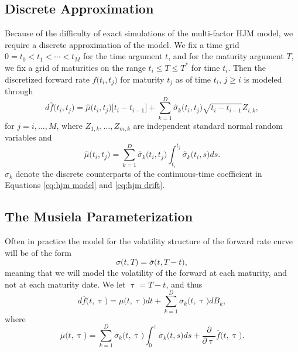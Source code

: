 \newpage

\subsection{Discrete Approximation} \label{sec:discrete approx}

\noindent Because of the difficulty of exact simulations of the multi-factor HJM model, we require a discrete approximation of the model. We fix a time grid $0 = t_0 < t_1 < \cdots < t_M$ for the time argument $t$, and for the maturity argument $T$, we fix a grid of maturities on the range $t_i \leq T \leq T^*$ for time $t_i$. Then the discretized forward rate $\hat{f} \bigl( t_i, t_j \bigr)$ for maturity $t_j$ as of time $t_i$, $j \geq i$ is modeled through \begin{equation} \label{eq:hjm model discretized}
    d \hat{f} \bigl( t_i, t_j \bigr) = \hat{\mu} \bigl( t_i, t_j \bigr) \bigl[ t_i - t_{i - 1} \bigr] + \sum_{k=1}^D \hat{\sigma}_k \bigl( t_i, t_j \bigr) \sqrt{t_i - t_{i - 1}} Z_{i,k},
\end{equation} for $j = i, \ldots, M$, where $Z_{1,k}, \ldots, Z_{m,k}$ are independent standard normal random variables and \begin{equation} \label{eq:hjm drift discretized}
    \hat{\mu} \bigl( t_i, t_j \bigr) =  \sum_{k=1}^D \hat{\sigma}_k \bigl( t_i, t_j \bigr) \int_{t_i}^{t_j} \hat{\sigma}_k \bigl( t_i, s \bigr)ds.
\end{equation} $\hat{\sigma}_k$ denote the discrete counterparts of the continuous-time coefficient in Equations \eqref{eq:hjm model} and \eqref{eq:hjm drift}. \cite[p.~155--156]{monte_carlo_method_financial_engineering}


\subsection{The Musiela Parameterization} \label{sec:musiela}

\noindent Often in practice the model for the volatility structure of the forward rate curve will be of the form \begin{equation*}
    \sigma \bigl( t, T \bigr) = \overline{\sigma} \bigl( t, T - t\bigr),
\end{equation*} meaning that we will model the volatility of the forward at each maturity, and not at each maturity date. We let $\uptau = T - t$, and thus \begin{equation*}
    d \overline{f} \bigl( t, \uptau \bigr) = \overline{\mu} \bigl( t, \uptau \bigr) dt + \sum_{k=1}^D \overline{\sigma}_k \bigl( t, \uptau \bigr) dB_k,
\end{equation*} where \begin{equation*}
    \overline{\mu} \bigl( t, \uptau \bigr) = \sum_{k=1}^D \overline{\sigma}_k \bigl( t, \uptau \bigr) \int_{0}^{\uptau} \overline{\sigma}_k \bigl( t, s \bigr)ds + \frac{\partial}{\partial \uptau} \overline{f} \bigl( t, \uptau \bigr).
\end{equation*} \cite[p.~614--615]{WFI}


